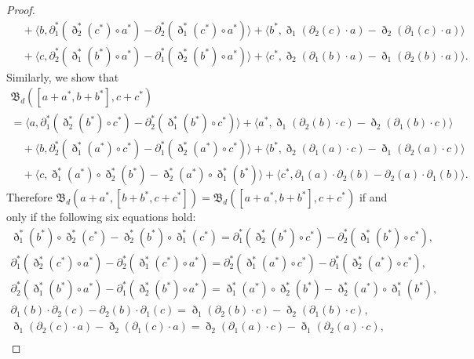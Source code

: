 \documentclass[10pt,a4paper]{amsart}
\numberwithin{equation}{section}
\begin{document}
\begin{proof}
\begin{gather*}
 \quad {}+ \langle b, \partial_1^{*}(\eth_2^{*}(c^*) \circ a^*) - \partial_2^{*}(\eth_1^{*}(c^*) \circ a^*) \rangle + \langle b^*, \eth_1(\partial_2(c) \cdot a)- \eth_2(\partial_1(c) \cdot a) \rangle \\
 \quad {}+ \langle c, \partial_2^{*}(\eth_1^{*}(b^*) \circ a^*) - \partial_1^{*}(\eth_2^{*}(b^*) \circ a^*) \rangle + \langle c^*, \eth_2(\partial_1(b) \cdot a) - \eth_1(\partial_2(b) \cdot a) \rangle.
 \end{gather*}
 Similarly, we show that
 \begin{gather*}
 \mathfrak{B}_d([a + a^*, b + b^*], c + c^*) \\
 = \langle a, \partial_1^{*}(\eth_2^{*}(b^*) \circ c^*) - \partial_2^{*}(\eth_1^{*}(b^*) \circ c^*) \rangle + \langle a^*, \eth_1(\partial_2(b) \cdot c)- \eth_2(\partial_1(b) \cdot c) \rangle \\
 \quad {}+ \langle b, \partial_2^{*}(\eth_1^{*}(a^*) \circ c^*) - \partial_1^{*}(\eth_2^{*}(a^*) \circ c^*) \rangle + \langle b^*, \eth_2(\partial_1(a) \cdot c) - \eth_1(\partial_2(a) \cdot c) \rangle \\
 \quad {}+ \langle c, \eth_1^{*}(a^*) \circ \eth_2^{*}(b^*) - \eth_2^{*}(a^*) \circ \eth_1^{*}(b^*) \rangle + \langle c^*, \partial_1(a) \cdot \partial_2(b) - \partial_2(a) \cdot \partial_1(b) \rangle.
 \end{gather*}
 Therefore $\mathfrak{B}_d(a + a^*, [b + b^*, c + c^*]) = \mathfrak{B}_d([a + a^*, b + b^*], c + c^*)$ if and only if the following six equations hold:
 \begin{gather}
 \eth_1^{*}(b^*) \circ \eth_2^{*}(c^*) - \eth_2^{*}(b^*) \circ \eth_1^{*}(c^*) = \partial_1^{*}(\eth_2^{*}(b^*) \circ c^*) - \partial_2^{*}(\eth_1^{*}(b^*) \circ c^*), \label{eq:pf151}\\
 \partial_1^{*}(\eth_2^{*}(c^*) \circ a^*) - \partial_2^{*}(\eth_1^{*}(c^*) \circ a^*) = \partial_2^{*}(\eth_1^{*}(a^*) \circ c^*) - \partial_1^{*}(\eth_2^{*}(a^*) \circ c^*), \label{eq:pf152}\\
 \partial_2^{*}(\eth_1^{*}(b^*) \circ a^*) - \partial_1^{*}(\eth_2^{*}(b^*) \circ a^*) = \eth_1^{*}(a^*) \circ \eth_2^{*}(b^*) - \eth_2^{*}(a^*) \circ \eth_1^{*}(b^*), \label{eq:pf153}\\
 \partial_1(b) \cdot \partial_2(c) - \partial_2(b) \cdot \partial_1(c) = \eth_1(\partial_2(b) \cdot c)- \eth_2(\partial_1(b) \cdot c), \label{eq:pf154}\\
 \eth_1(\partial_2(c) \cdot a)- \eth_2(\partial_1(c) \cdot a) = \eth_2(\partial_1(a) \cdot c) - \eth_1(\partial_2(a) \cdot c), \label{eq:pf155}\\

\end{gather}
\end{proof}
\end{document}
